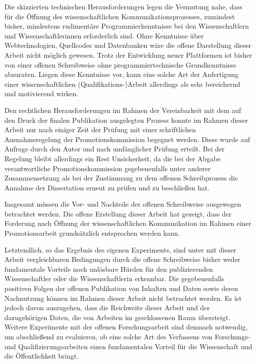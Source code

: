 Die skizzierten technischen Herausforderungen legen die Vermutung nahe, dass für die Öffnung des wissenschaftlichen Kommunikationsprozesses, zumindest bisher, mindestens rudimentäre Programmierkenntnisse bei den Wissenschaftlern und Wissenschaftlerinnen erforderlich sind. Ohne Kenntnisse über Webtechnologien, Quellcodes und Datenbanken wäre die offene Darstellung dieser Arbeit nicht möglich gewesen. Trotz der Entwicklung neuer Plattformen ist bisher von einer offenen Schreibweise ohne programmiertechnische Grundkenntnisse abzuraten. Liegen diese Kenntnisse vor, kann eine solche Art der Anfertigung einer wissenschaftlichen (Qualifikations-)Arbeit allerdings als sehr bereichernd und motivierend wirken.

Den rechtlichen Herausforderungen im Rahmen der Vereinbarkeit mit dem auf den Druck der finalen Publikation ausgelegten Prozess konnte im Rahmen dieser Arbeit nur nach einiger Zeit der Prüfung mit einer schriftlichen Ausnahmeregelung der Promotionskommission begegnet werden. Diese wurde auf Anfrage durch den Autor und nach umfänglicher Prüfung erteilt. Bei der Regelung bleibt allerdings ein Rest Unsicherheit, da die bei der Abgabe verantwortliche Promotionskommission gegebenenfalls unter anderer Zusammensetzung als bei der Zustimmung zu dem offenen Schreibprozess die Annahme der Dissertation erneut zu prüfen und zu beschließen hat.

Insgesamt müssen die Vor- und Nachteile der offenen Schreibweise ausgewogen betrachtet werden. Die offene Erstellung dieser Arbeit hat gezeigt, dass der Forderung nach Öffnung der wissenschaftlichen Kommunikation im Rahmen einer Promotionsarbeit grundsätzlich entsprochen werden kann.

Letztendlich, so das Ergebnis des eigenen Experiments, sind unter mit dieser Arbeit vergleichbaren Bedingungen durch die offene Schreibweise bisher weder fundamentale Vorteile noch unlösbare Hürden für den publizierenden Wissenschaftler oder die Wissenschaftlerin erkennbar. Die gegebenenfalls positiven Folgen der offenen Publikation von Inhalten und Daten sowie deren Nachnutzung können im Rahmen dieser Arbeit nicht betrachtet werden. Es ist jedoch davon auszugehen, dass die Reichweite dieser Arbeit und der dazugehörigen Daten, die von Arbeiten im geschlossenen Raum übersteigt. Weitere Experimente mit der offenen Forschungsarbeit sind demnach notwendig, um abschließend zu evaluieren, ob eine solche Art des Verfassens von Forschungs- und Qualifizierungsarbeiten einen fundamentalen Vorteil für die Wissenschaft und die Öffentlichkeit bringt.

